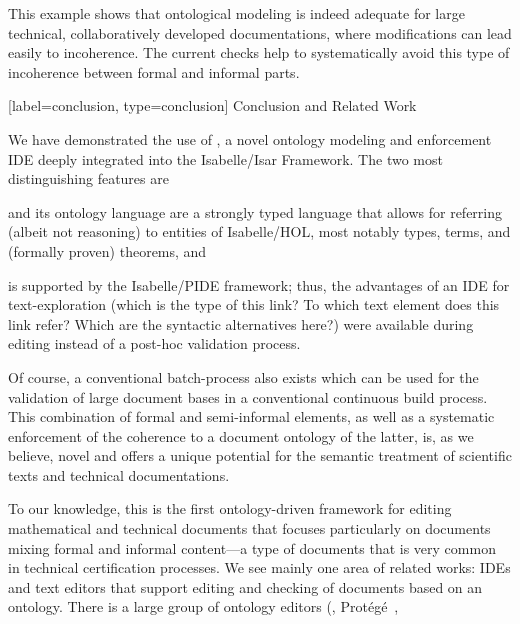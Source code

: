 \begin{isabellebody}
\begin{isamarkuptext}
This example shows that ontological modeling is indeed adequate for large technical,
collaboratively developed documentations, where modifications can lead easily to incoherence. 
The current checks help to systematically avoid this type of incoherence between formal and 
informal parts.%
\end{isamarkuptext}\isamarkuptrue%
%
\isaDofSectionConclusion%
%
[label={conclusion}, type={conclusion}]%
{Conclusion and Related Work}%
%
\begin{isamarkuptext}%
We have demonstrated the use of \isadof, a novel ontology modeling and enforcement
IDE deeply integrated into the Isabelle/Isar Framework. The two most distinguishing features are
\begin{compactitem}
\item \isadof and its ontology language  are a strongly typed language that allows
  for referring (albeit not reasoning) to entities of Isabelle/HOL, most notably types, terms,
  and (formally proven) theorems, and
\item \isadof is supported by the Isabelle/PIDE framework; thus, the advantages of an IDE for 
  text-exploration (which is the type of this link? To which text element does this link refer?
  Which are the syntactic alternatives here?) were available during editing
  instead of a post-hoc validation process.
\end{compactitem}%
\end{isamarkuptext}\isamarkuptrue%
%
\begin{isamarkuptext}%
Of course, a conventional batch-process  also exists which can be used
for the validation of large document bases in a conventional continuous build process.
This combination of formal and semi-informal elements, as well as a systematic enforcement
of the coherence to a document ontology of the latter, is, as we believe, novel and offers 
a unique potential for the semantic treatment of scientific texts and technical documentations.%
\end{isamarkuptext}\isamarkuptrue%
%
\begin{isamarkuptext}%
To our knowledge, this is the first ontology-driven framework for
editing mathematical and technical documents that focuses particularly
on documents mixing formal and informal content---a type of documents
that is very common in technical certification processes. We see
mainly one area of related works: IDEs and text editors that support
editing and checking of documents based on an ontology.  There is a
large group of ontology editors (\eg, Prot{\'e}g{\'e}~\cite{protege},

\end{isamarkuptext}
\end{isabellebody}
